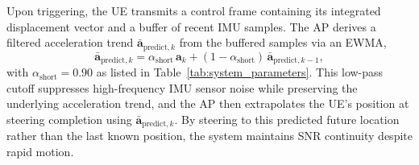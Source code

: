 \documentclass[fleqn,10pt]{wlscirep}
\newcommand{\rev}[1]{{\color{revblue}#1}}
\begin{document}
Upon triggering, the UE transmits a control frame containing its integrated displacement vector and a buffer of recent IMU samples. \rev{The AP derives a filtered acceleration trend $\bar{\mathbf{a}}_{\text{predict},k}$ from the buffered samples via an EWMA,
\begin{equation}
    \bar{\mathbf{a}}_{\text{predict},k} = \alpha_{\text{short}}\, \mathbf{a}_k + (1 - \alpha_{\text{short}})\, \bar{\mathbf{a}}_{\text{predict},k-1},
    \label{eq:ewma_predict}
\end{equation}
with $\alpha_{\text{short}} = 0.90$ as listed in Table~\ref{tab:system_parameters}. This low-pass cutoff suppresses high-frequency IMU sensor noise while preserving the underlying acceleration trend, and the AP then extrapolates the UE's position at steering completion using $\bar{\mathbf{a}}_{\text{predict},k}$.} By steering to this predicted future location rather than the last known position, the system maintains SNR continuity despite rapid motion.
\end{document}
